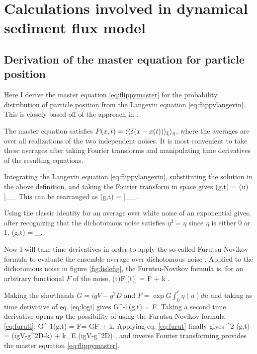 
\chapter{Calculations involved in dynamical sediment flux model}
\label{sec:appendixA}
\section{Derivation of the master equation for particle position}
\label{sec:appAmaster}
Here I derive the master equation \ref{eq:flippymaster} for the probability distribution of particle position from the Langevin equation \ref{eq:flippylangevin}. This is closely based off of the approach in \citet{Balakrishnan1993}.

The master equation satisfies $P(x,t) = \langle\langle \delta(x-x(t))\rangle_\xi \rangle_\eta$, where the averages are over all realizations of the two independent noises. It is most convenient to take these averages after taking Fourier transforms and manipulating time derivatives of the resulting equations.

Integrating the Langevin equation \ref{eq:flippylangevin}, substituting the solution in the above definition, and taking the Fourier transform in space gives
\be {}(g,t) = \Big\bra  \Big\bra \exp \Big[- i g \int_0^t du [V+\sqrt{2D}\xi(u)]\eta(u) \Big]\Big\ket_\eta \Big\ket_\xi\ee
This can be rearranged as
\be {}(g,t) = \Big\bra \exp{} \Big\bra \exp{}\Big]\Big\ket_\xi \Big\ket_\eta .\ee

Using the classic identity for an average over white noise of an exponential \citep{Balakrishnan1993,VanKampen2007} gives, after recognizing that the dichotomous noise satisfies $\eta^2 = \eta$ since $\eta$ is either $0$ or $1$,
\be {}(g,t) = \Big\bra \exp{}\Big\ket_\eta. \label{eq:logi}\ee

Now I will take time derivatives in order to apply the so-called Furutsu-Novikov formula to evaluate the ensemble average over dichotomous noise \citep{Shapiro1978}. Applied to the dichotomous noise in figure \ref{fig:lislefig}, the Furutsu-Novikov formula is, for an arbitrary functional $F$ of the noise,
\be \pt \bra \eta(t)F[\eta(t)] \ket = \bra \eta \pt F \ket + k   \label{eq:furuti}.\ee


Making the shorthands $G = igV-g^2D$ and $F=\exp G\int_0^t \eta(u)du$ and taking as time derivative of eq. \ref{eq:logi} gives
\be G^{-1}\pt {}(g,t) = \bra \eta F\ket. \label{eq:furut}\ee
Taking a second time derivative opens up the possibility of using the Furutsu-Novikov formula \ref{eq:furuti}: 
\be G^{-1}\pt {}(g,t) = \pt \bra \eta F\ket = G\bra \eta F \ket + k. \ee
Applying eq. \ref{eq:furut} finally gives
\be \pt^2 (g,t)  = (igV-g^2D-k)\pt  {} + k_E (igV-g^2D) ,\ee
and inverse Fourier transforming provides the master equation \ref{eq:flippymaster}.

